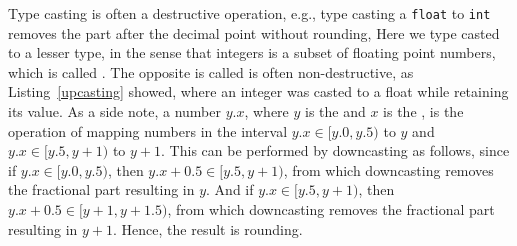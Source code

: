 Type casting is often a destructive operation, e.g., type casting a \lstinline{float} to \lstinline{int} removes the part after the decimal point without rounding,
%
Here we type casted to a lesser type, in the sense that integers is a subset of floating point numbers, which is called . The opposite is called  is often non-destructive, as Listing~\ref{upcasting} showed, where an integer was casted to a float while retaining its value. As a side note,  a number $y.x$, where $y$ is the  and $x$ is the , is the operation of mapping numbers in the interval $y.x \in [y.0,y.5)$ to $y$ and $y.x\in [y.5,y+1)$ to $y+1$. This can be performed by downcasting as follows,
%
%
since if $y.x\in [y.0, y.5)$, then $y.x+0.5\in [y.5, y+1)$, from which downcasting removes the fractional part resulting in $y$. And if $y.x\in [y.5, y+1)$, then $y.x+0.5\in [y+1,y+1.5)$, from which downcasting removes the fractional part resulting in $y+1$. Hence, the result is rounding. 

